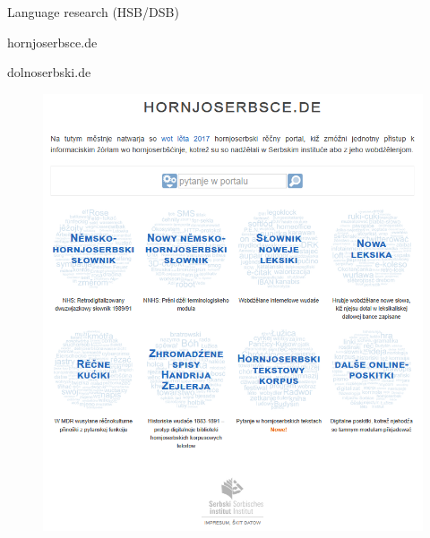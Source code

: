   \begin{block}{Language research (HSB/DSB)}  
  

    hornjoserbsce.de

    dolnoserbski.de

    \begin{figure}
        \centering
        \includegraphics[width=0.7\colwidth]{04_z_01_hornjoserbsce_gross.png}
        \label{fig:hornjoserbsce}
    \end{figure}

  \end{block}
